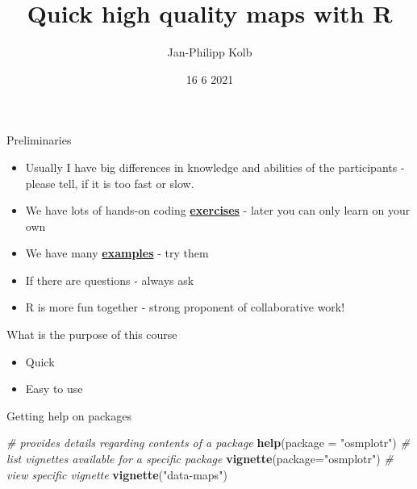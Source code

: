 \documentclass[
  ignorenonframetext,
]{beamer}
\title{Quick high quality maps with R}
\author{Jan-Philipp Kolb}
\date{16 6 2021}
\newenvironment{Shaded}{\begin{snugshade}}{\end{snugshade}}
\newcommand{\CommentTok}[1]{\textcolor[rgb]{0.56,0.35,0.01}{\textit{#1}}}
\newcommand{\DataTypeTok}[1]{\textcolor[rgb]{0.13,0.29,0.53}{#1}}
\newcommand{\KeywordTok}[1]{\textcolor[rgb]{0.13,0.29,0.53}{\textbf{#1}}}
\newcommand{\NormalTok}[1]{#1}
\newcommand{\StringTok}[1]{\textcolor[rgb]{0.31,0.60,0.02}{#1}}
\providecommand{\tightlist}{%
  \setlength{\itemsep}{0pt}\setlength{\parskip}{0pt}}
\begin{document}
\frame{\titlepage}

\begin{frame}{Preliminaries}
\protect\hypertarget{preliminaries}{}
\begin{itemize}
\tightlist
\item
  Usually I have big differences in knowledge and abilities of the
  participants - please tell, if it is too fast or slow.
\item
  We have lots of hands-on coding
  \href{http://web.math.ku.dk/~helle/R-intro/exercises.pdf}{\textbf{exercises}}
  - later you can only learn on your own
\item
  We have many \href{https://www.showmeshiny.com/}{\textbf{examples}} -
  try them
\item
  If there are questions - always ask
\item
  R is more fun together - strong proponent of collaborative work!
\end{itemize}
\end{frame}

\begin{frame}{What is the purpose of this course}
\protect\hypertarget{what-is-the-purpose-of-this-course}{}
\begin{itemize}
\tightlist
\item
  Quick
\item
  Easy to use
\end{itemize}
\end{frame}

\begin{frame}[fragile]{Getting help on packages}
\protect\hypertarget{getting-help-on-packages}{}
\begin{Shaded}
\begin{Highlighting}[]
\CommentTok{\# provides details regarding contents of a package}
\KeywordTok{help}\NormalTok{(}\DataTypeTok{package =} \StringTok{"osmplotr"}\NormalTok{)}
\CommentTok{\# list vignettes available for a specific package}
\KeywordTok{vignette}\NormalTok{(}\DataTypeTok{package=}\StringTok{"osmplotr"}\NormalTok{)}
\CommentTok{\# view specific vignette}
\KeywordTok{vignette}\NormalTok{(}\StringTok{"data{-}maps"}\NormalTok{)}
\end{Highlighting}
\end{Shaded}
\end{frame}
\end{document}
